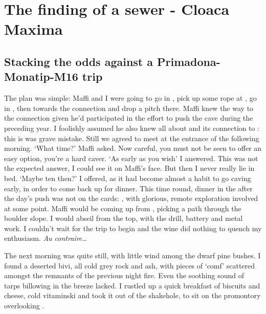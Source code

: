 \section{The finding of a sewer - Cloaca Maxima}


\subsection{Stacking the odds against a Primadona-Monatip-M16 trip}
The plan was simple: Maffi and I were going to go in , pick up some rope at , go in , then towards the  connection and drop a pitch there. Maffi knew the way to the connection given he'd participated in the effort to push the cave during the preceding year. I foolishly assumed he also knew all about  and its connection to : this is was grave mistake. Still we agreed to meet at the entrance of  the following morning. 
`What time?' Maffi asked. Now careful, you must not be seen to offer an easy option, you're a hard caver.
`As early as you wish' I answered. This was not the expected answer, I could see it on Maffi's face. But then I never really lie in bed.
`Maybe ten then?' I offered, as it had become almost a habit to go caving early, in order to come back up for dinner. This time round, dinner in the  after the day's push was not on the cards: , with glorious, remote exploration involved at some point. Maffi would be coming up from , picking a path through the boulder slope. I would abseil from the top, with the drill, battery and metal work. I couldn't wait for the trip to begin and the wine did nothing to quench my enthusiasm. \textit{Au contraire…}

\mydelimiter

The next morning was quite still, with little wind among the dwarf pine bushes. I found a deserted bivi, all cold grey rock and ash, with pieces of `comf' scattered amongst the remnants of the previous night fire. Even the soothing sound of tarps billowing in the breeze lacked. I rustled up a quick breakfast of biscuits and cheese, cold vitaminski and took it out of the shakehole, to sit on the promontory overlooking . 

